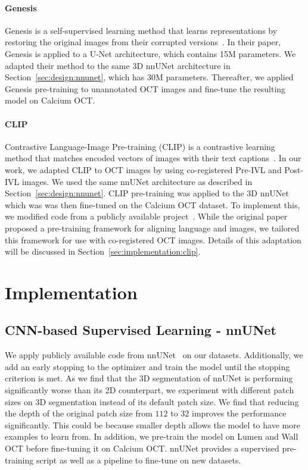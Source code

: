 \documentclass[a4paper,11pt,oneside]{report}
\begin{document}
\subsubsection{Genesis}
Genesis is a self-supervised learning method that learns representations by restoring the original images from their corrupted versions~\cite{Zhou2021}. In their paper, Genesis is applied to a U-Net architecture, which contains 15M parameters. We adapted their method to the same 3D nnUNet architecture in Section~\ref{sec:design:nnunet}, which has 30M parameters. Thereafter, we applied Genesis pre-training to unannotated OCT images and fine-tune the resulting model on Calcium OCT.

\subsubsection{CLIP}
Contrastive Language-Image Pre-training (CLIP) is a contrastive learning method that matches encoded vectors of images with their text captions~\cite{Radford2021CLIP}. In our work, we adapted CLIP to OCT images by using co-registered Pre-IVL and Post-IVL images. We used the same nnUNet architecture as described in Section~\ref{sec:design:nnunet}. CLIP pre-training was applied to the 3D nnUNet which was was then fine-tuned on the Calcium OCT dataset. To implement this, we modified code from a publicly available project~\cite{Shariatnia2021}. While the original paper proposed a pre-training framework for aligning language and images, we tailored this framework for use with co-registered OCT images. Details of this adaptation will be discussed in Section~\ref{sec:implementation:clip}.

\chapter{Implementation}


\section{CNN-based Supervised Learning - nnUNet}
We apply publicly available code from nnUNet~\cite{Isensee2020} on our datasets. Additionally, we add an early stopping to the optimizer and train the model until the stopping criterion is met. As we find that the 3D segmentation of nnUNet is performing significantly worse than its 2D counterpart, we experiment with different patch sizes on 3D segmentation instead of its default patch size. We find that reducing the depth of the original patch size from $112$ to $32$ improves the performance significantly. This could be because smaller depth allows the model to have more examples to learn from. In addition, we pre-train the model on Lumen and Wall OCT before fine-tuning it on Calcium OCT. nnUNet provides a supervised pre-training script as well as a pipeline to fine-tune on new datasets.
\end{document}
